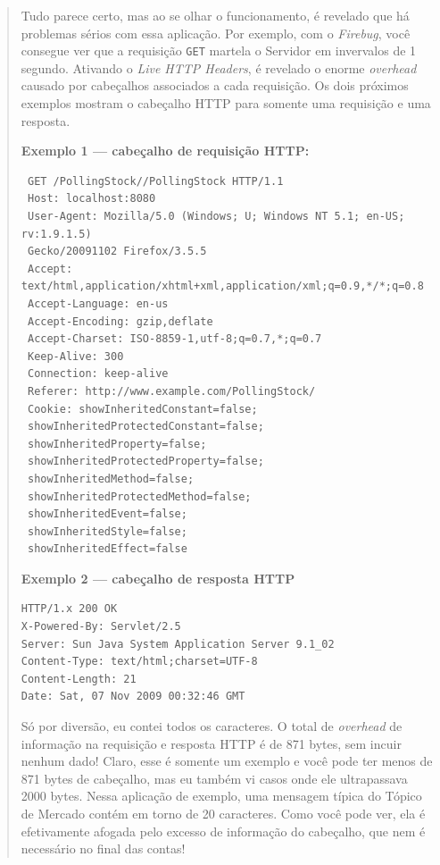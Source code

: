 \documentclass[a4paper,12pt]{article}
\newcommand{\code}[1]{\lstinline[mathescape=true, columns=fixed, basicstyle={\small\ttfamily}]{#1}}
\begin{document}
\begin{quotation}
Tudo parece certo, mas ao se olhar o funcionamento, é revelado que há problemas sérios com essa aplicação. Por exemplo, com o \emph{Firebug}, você consegue ver que a requisição \code{GET} martela o Servidor em invervalos de 1 segundo. Ativando o \emph{Live HTTP Headers}, é revelado o enorme \emph{overhead} causado por cabeçalhos associados a cada requisição. Os dois próximos exemplos mostram o cabeçalho HTTP para somente uma requisição e uma resposta.

\textbf{Exemplo 1 — cabeçalho de requisição HTTP:}
\begin{lstlisting}
 GET /PollingStock//PollingStock HTTP/1.1
 Host: localhost:8080
 User-Agent: Mozilla/5.0 (Windows; U; Windows NT 5.1; en-US; rv:1.9.1.5)
 Gecko/20091102 Firefox/3.5.5
 Accept: text/html,application/xhtml+xml,application/xml;q=0.9,*/*;q=0.8
 Accept-Language: en-us
 Accept-Encoding: gzip,deflate
 Accept-Charset: ISO-8859-1,utf-8;q=0.7,*;q=0.7
 Keep-Alive: 300
 Connection: keep-alive
 Referer: http://www.example.com/PollingStock/
 Cookie: showInheritedConstant=false;
 showInheritedProtectedConstant=false;
 showInheritedProperty=false;
 showInheritedProtectedProperty=false;
 showInheritedMethod=false;
 showInheritedProtectedMethod=false;
 showInheritedEvent=false;
 showInheritedStyle=false;
 showInheritedEffect=false
\end{lstlisting}

\textbf{Exemplo 2 — cabeçalho de resposta HTTP}
\begin{lstlisting}
HTTP/1.x 200 OK
X-Powered-By: Servlet/2.5
Server: Sun Java System Application Server 9.1_02
Content-Type: text/html;charset=UTF-8
Content-Length: 21
Date: Sat, 07 Nov 2009 00:32:46 GMT
\end{lstlisting}

Só por diversão, eu contei todos os caracteres. O total de \emph{overhead} de informação na requisição e resposta HTTP é de 871 bytes, sem incuir nenhum dado! Claro, esse é somente um exemplo e você pode ter menos de 871 bytes de cabeçalho, mas eu também vi casos onde ele ultrapassava 2000 bytes. Nessa aplicação de exemplo, uma mensagem típica do Tópico de Mercado contém em torno de 20 caracteres. Como você pode ver, ela é efetivamente afogada pelo excesso de informação do cabeçalho, que nem é necessário no final das contas!


\end{quotation}
\end{document}

